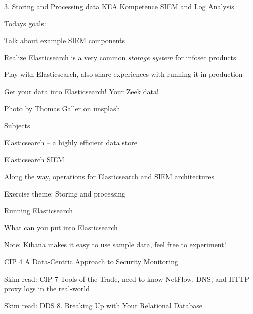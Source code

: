 \documentclass[Screen16to9,17pt]{foils}
\begin{document}
\mytitlepage
{3. Storing and Processing data}
{KEA Kompetence SIEM and Log Analysis}




Todays goals:
\begin{list2}
\item Talk about example SIEM components
\item Realize Elasticsearch is a very common \emph{storage system} for infosec products
\item Play with Elasticsearch, also share experiences with running it in production
\item Get your data into Elasticsearch! Your Zeek data!
\end{list2}

Photo by Thomas Galler on unsplash


\begin{list1}
\item Subjects
\begin{list2}
\item Elasticsearch -- a highly efficient data store
\item Elasticsearch SIEM
\item Along the way, operations for Elasticsearch and SIEM architectures
\end{list2}
\item Exercise theme: Storing and processing
\begin{list2}
\item Running Elasticsearch
\item What can you put into Elasticsearch

\end{list2}
\end{list1}




Note: Kibana makes it easy to use sample data, feel free to experiment!



\begin{list1}
\item CIP 4 A Data-Centric Approach to Security Monitoring
\item Skim read: CIP 7 Tools of the Trade, need to know NetFlow, DNS, and HTTP proxy logs in the real-world
\item Skim read: DDS 8. Breaking Up with Your Relational Database
\end{list1}
\end{document}
